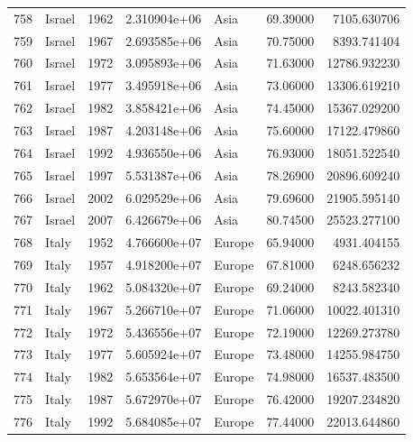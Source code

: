 \documentclass[
  letterpaper,
  DIV=11,
  numbers=noendperiod]{scrreprt}
\begin{document}
\begin{tabular}{llrrlrr}
758  &                    Israel &  1962 &  2.310904e+06 &      Asia &  69.39000 &    7105.630706 \\
759  &                    Israel &  1967 &  2.693585e+06 &      Asia &  70.75000 &    8393.741404 \\
760  &                    Israel &  1972 &  3.095893e+06 &      Asia &  71.63000 &   12786.932230 \\
761  &                    Israel &  1977 &  3.495918e+06 &      Asia &  73.06000 &   13306.619210 \\
762  &                    Israel &  1982 &  3.858421e+06 &      Asia &  74.45000 &   15367.029200 \\
763  &                    Israel &  1987 &  4.203148e+06 &      Asia &  75.60000 &   17122.479860 \\
764  &                    Israel &  1992 &  4.936550e+06 &      Asia &  76.93000 &   18051.522540 \\
765  &                    Israel &  1997 &  5.531387e+06 &      Asia &  78.26900 &   20896.609240 \\
766  &                    Israel &  2002 &  6.029529e+06 &      Asia &  79.69600 &   21905.595140 \\
767  &                    Israel &  2007 &  6.426679e+06 &      Asia &  80.74500 &   25523.277100 \\
768  &                     Italy &  1952 &  4.766600e+07 &    Europe &  65.94000 &    4931.404155 \\
769  &                     Italy &  1957 &  4.918200e+07 &    Europe &  67.81000 &    6248.656232 \\
770  &                     Italy &  1962 &  5.084320e+07 &    Europe &  69.24000 &    8243.582340 \\
771  &                     Italy &  1967 &  5.266710e+07 &    Europe &  71.06000 &   10022.401310 \\
772  &                     Italy &  1972 &  5.436556e+07 &    Europe &  72.19000 &   12269.273780 \\
773  &                     Italy &  1977 &  5.605924e+07 &    Europe &  73.48000 &   14255.984750 \\
774  &                     Italy &  1982 &  5.653564e+07 &    Europe &  74.98000 &   16537.483500 \\
775  &                     Italy &  1987 &  5.672970e+07 &    Europe &  76.42000 &   19207.234820 \\
776  &                     Italy &  1992 &  5.684085e+07 &    Europe &  77.44000 &   22013.644860 \\

\end{tabular}
\end{document}
